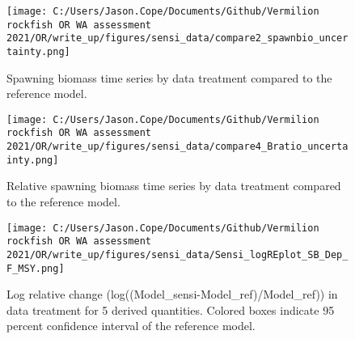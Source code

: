 \documentclass[11pt,
  english,
  a4paper,
]{article}
\begin{document}
\tagmcend\tagstructend


\begin{figure}
\centering
\texttt{[image: C:/Users/Jason.Cope/Documents/Github/Vermilion rockfish OR WA assessment 2021/OR/write\_up/figures/sensi\_data/compare2\_spawnbio\_uncertainty.png]}
\caption{Spawning biomass time series by data treatment compared to the reference model.\label{fig:sensi-data-ssb}}
\end{figure}

\tagmcend\tagstructend


\begin{figure}
\centering
\texttt{[image: C:/Users/Jason.Cope/Documents/Github/Vermilion rockfish OR WA assessment 2021/OR/write\_up/figures/sensi\_data/compare4\_Bratio\_uncertainty.png]}
\caption{Relative spawning biomass time series by data treatment compared to the reference model.\label{fig:sensi-data-depl}}
\end{figure}

\tagmcend\tagstructend


\begin{figure}
\centering
\texttt{[image: C:/Users/Jason.Cope/Documents/Github/Vermilion rockfish OR WA assessment 2021/OR/write\_up/figures/sensi\_data/Sensi\_logREplot\_SB\_Dep\_F\_MSY.png]}
\caption{Log relative change (log((Model\_sensi-Model\_ref)/Model\_ref)) in data treatment for 5 derived quantities. Colored boxes indicate 95 percent confidence interval of the reference model.\label{fig:sensi-modspec-RE}}
\end{figure}

\tagmcend\tagstructend

\end{document}

